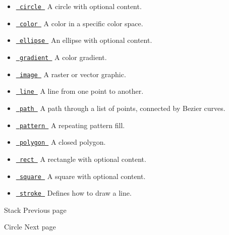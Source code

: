 \begin{itemize}
\tightlist
\item
  \href{/docs/reference/visualize/circle/}{\texttt{\ circle\ }} { A
  circle with optional content. }
\item
  \href{/docs/reference/visualize/color/}{\texttt{\ color\ }} { A color
  in a specific color space. }
\item
  \href{/docs/reference/visualize/ellipse/}{\texttt{\ ellipse\ }} { An
  ellipse with optional content. }
\item
  \href{/docs/reference/visualize/gradient/}{\texttt{\ gradient\ }} { A
  color gradient. }
\item
  \href{/docs/reference/visualize/image/}{\texttt{\ image\ }} { A raster
  or vector graphic. }
\item
  \href{/docs/reference/visualize/line/}{\texttt{\ line\ }} { A line
  from one point to another. }
\item
  \href{/docs/reference/visualize/path/}{\texttt{\ path\ }} { A path
  through a list of points, connected by Bezier curves. }
\item
  \href{/docs/reference/visualize/pattern/}{\texttt{\ pattern\ }} { A
  repeating pattern fill. }
\item
  \href{/docs/reference/visualize/polygon/}{\texttt{\ polygon\ }} { A
  closed polygon. }
\item
  \href{/docs/reference/visualize/rect/}{\texttt{\ rect\ }} { A
  rectangle with optional content. }
\item
  \href{/docs/reference/visualize/square/}{\texttt{\ square\ }} { A
  square with optional content. }
\item
  \href{/docs/reference/visualize/stroke/}{\texttt{\ stroke\ }} {
  Defines how to draw a line. }
\end{itemize}

\href{/docs/reference/layout/stack/}{\pandocbounded{}}

{ Stack } { Previous page }

\href{/docs/reference/visualize/circle/}{\pandocbounded{}}

{ Circle } { Next page }
